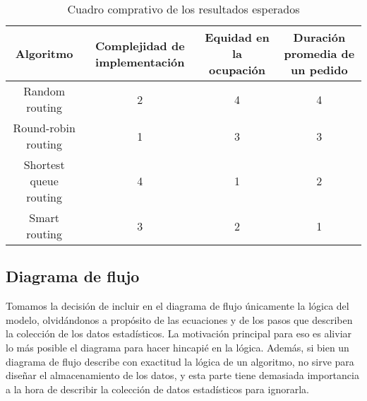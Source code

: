 \begin{table}
    \centering
    \begin{tabulary}{\textwidth}{|c||C|C|C|}
    \hline
    Algoritmo & Complejidad  de implementación & Equidad en la ocupación & Duración promedia de un pedido \\
    \hline
	Random routing & 2 & 4 & 4\\
	\hline
	Round-robin routing & 1 & 3 & 3\\
	\hline
	Shortest queue routing & 4 & 1 & 2\\
	\hline
	Smart routing & 3 & 2 & 1\\
	\hline
    \end{tabulary}
    \caption{Cuadro comprativo de los resultados esperados}
    \label{tab:comparativo-esperados}
\end{table}

\subsection{Diagrama de flujo}

Tomamos la decisión de incluir en el diagrama de flujo únicamente la lógica del modelo,
olvidándonos a propósito de las ecuaciones y de los pasos que describen la colección de los
datos estadísticos. La motivación principal para eso es aliviar lo más posible el diagrama
para hacer hincapié en la lógica. Además, si bien un diagrama de flujo describe con exactitud
la lógica de un algoritmo, no sirve para diseñar el almacenamiento de los datos, y esta parte
tiene demasiada importancia a la hora de describir la colección de datos estadísticos para
ignorarla.


